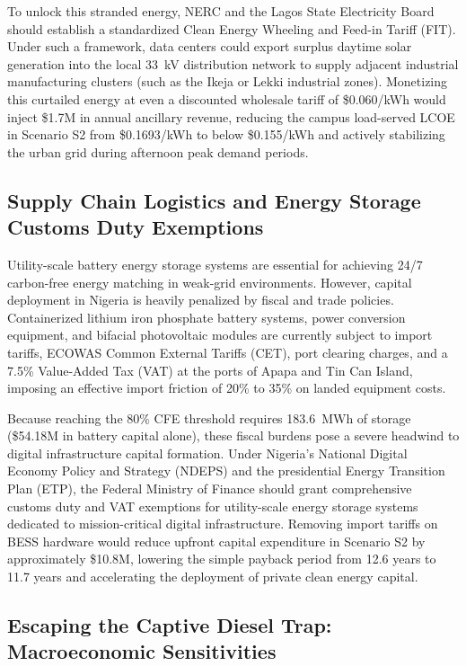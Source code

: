 \documentclass[11pt,a4paper]{article}
\begin{document}
To unlock this stranded energy, NERC and the Lagos State Electricity Board should establish a standardized Clean Energy Wheeling and Feed-in Tariff (FIT). Under such a framework, data centers could export surplus daytime solar generation into the local 33~kV distribution network to supply adjacent industrial manufacturing clusters (such as the Ikeja or Lekki industrial zones). Monetizing this curtailed energy at even a discounted wholesale tariff of \$0.060/kWh would inject \$1.7M in annual ancillary revenue, reducing the campus load-served LCOE in Scenario S2 from \$0.1693/kWh to below \$0.155/kWh and actively stabilizing the urban grid during afternoon peak demand periods.

\subsection{Supply Chain Logistics and Energy Storage Customs Duty Exemptions}
\label{subsec:policy_customs}

Utility-scale battery energy storage systems are essential for achieving 24/7 carbon-free energy matching in weak-grid environments. However, capital deployment in Nigeria is heavily penalized by fiscal and trade policies. Containerized lithium iron phosphate battery systems, power conversion equipment, and bifacial photovoltaic modules are currently subject to import tariffs, ECOWAS Common External Tariffs (CET), port clearing charges, and a 7.5\% Value-Added Tax (VAT) at the ports of Apapa and Tin Can Island, imposing an effective import friction of 20\% to 35\% on landed equipment costs.

Because reaching the 80\% CFE threshold requires 183.6~MWh of storage (\$54.18M in battery capital alone), these fiscal burdens pose a severe headwind to digital infrastructure capital formation. Under Nigeria's National Digital Economy Policy and Strategy (NDEPS) and the presidential Energy Transition Plan (ETP), the Federal Ministry of Finance should grant comprehensive customs duty and VAT exemptions for utility-scale energy storage systems dedicated to mission-critical digital infrastructure. Removing import tariffs on BESS hardware would reduce upfront capital expenditure in Scenario S2 by approximately \$10.8M, lowering the simple payback period from 12.6 years to 11.7 years and accelerating the deployment of private clean energy capital.

\subsection{Escaping the Captive Diesel Trap: Macroeconomic Sensitivities}
\label{subsec:policy_diesel_trap}
\end{document}
